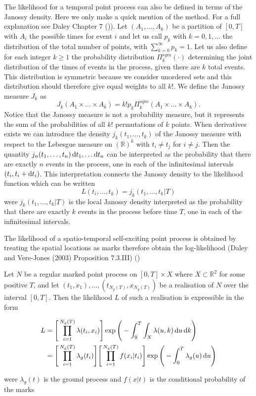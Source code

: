 The likelihood for a temporal point process can also be defined in terms of the Janossy density. Here we only make a quick mention of the method. For a full explanation see Daley Chapter 7 (\cite{Daley})).
Let $(A_1, \dots, A_k)$ be a partition of $[0, T]$ with $A_i$ the possible times for event $i$ and let us call $p_k$ with $k = 0, 1, \dots$ the distribution of the total number of points, with $\sum_{k=0}^\infty p_k = 1$. Let us also define for each integer $k \geq 1$ the probability distribution $\Pi_k^{sym}(\cdot)$ determining the joint distribution of the times of events in the process, given there are $k$ total events. This distribution is symmetric because we consider unordered sets and this distribution should therefore give equal weights to all $k!$. We define the Janossy measure $J_k$ as
\begin{equation*}
    J_k(A_1 \times \dots \times A_k) = k!p_k\Pi_k^{sym}(A_1 \times \dots \times A_k).
\end{equation*}
Notice that the Janossy measure is not a probability measure, but it represents the sum of the probabilities of all $k!$ permutations of $k$ points. 
When derivatives exists we can introduce the density $j_k(t_1, \dots, t_k)$ of the Janossy measure with respect to the Lebesgue measure on $(\mathbb{R})^k$ with $t_i \neq t_j$ for $i \neq j$. Then the quantity $j_n(t_1, \dots, t_n)\operatorname{d}\!{t}_1, \dots \operatorname{d}\!{t}_n$ can be interpreted as the probability that there are exactly $n$ events in the process, one in each of the infinitesimal intervals $(t_i, t_i+\operatorname{d}\!{t}_i)$. This interpretation connects the Janossy density to the likelihood function which can be written
\begin{equation*}
    L(t_i,\dots, t_k) = j_k(t_1, \dots, t_k | T)
\end{equation*}
were $j_k(t_1, \dots, t_k | T)$ is the local Janossy density interpreted as the probability that there are exactly $k$ events in the process before time $T$, one in each of the infinitesimal intervals.

The likelihood of a spatio-temporal self-exciting point process is obtained by treating the spatial locations as marks therefore obtain the log-likelihood (Daley and Vere-Jones (2003) Proposition 7.3.III) (\cite{Daley})

\begin{proposition}
    Let $N$ be a regular marked point process on $[0, T] \times X$ where $X \subset \mathbb{R}^2$ for some positive $T$, and let $(t_1, x_1), \dots, (t_{N_g(T)}, x_{N_g(T)})$ be a realisation of $N$ over the interval $[0, T]$. Then the likelihood $L$ of such a realisation is expressible  in the form
    
    \begin{align*}
        L &= \Bigg[ \prod_{i=1}^{N_g(T)} \lambda(t_i, x_i) \Bigg]\exp \Bigg( -\int_{0}^{T} \int_X \lambda(u, k) \operatorname{d}\!{u} \operatorname{d}\!{k} \Bigg) \\
        &= \Bigg[ \prod_{i=1}^{N_g(T)} \lambda_g(t_i) \Bigg] \Bigg[ \prod_{i=1}^{N_g(T)} f(x_i | t_i) \Bigg]\exp \Bigg( -\int_{0}^{T} \lambda_g(u) \operatorname{d}\!{u} \Bigg)
    \end{align*}
\end{proposition}
were $\lambda_g(t)$ is the ground process and $f(x | t)$ is the conditional probability of the marks 

